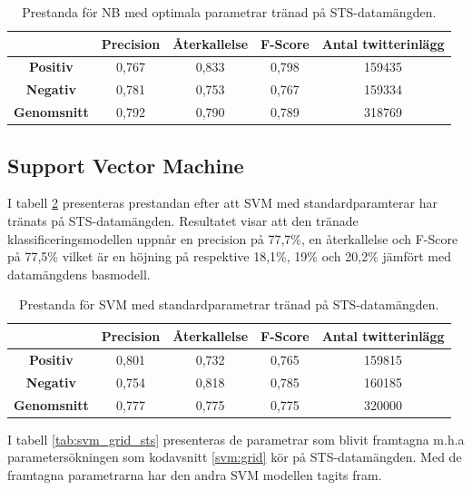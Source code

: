\documentclass{kaumasters} %
\begin{document}
\begin{table}[H]
\centering
\caption{Prestanda för NB med optimala parametrar tränad på STS-datamängden.}
\label{tab:nb_imp_sts}
    \begin{tabular}{ccccc}
    \toprule
     & \textbf{Precision} & \textbf{Återkallelse} & \textbf{F-Score} & \textbf{Antal twitterinlägg}  \\
    \midrule
    \textbf{Positiv} & 0,767 & 0,833 & 0,798 & 159435 \\
    \textbf{Negativ} & 0,781 & 0,753 & 0,767 & 159334 \\
    \midrule
    \textbf{Genomsnitt} & 0,792 & 0,790 & 0,789  & 318769 \\
    \bottomrule
\end{tabular}
\end{table}

\subsection{Support Vector Machine}
I tabell \ref{tab:svm_base_sts} presenteras prestandan efter att SVM med standardparamterar har tränats på STS-datamängden. Resultatet visar att den tränade klassificeringsmodellen uppnår en precision på 77,7\%, en återkallelse och F-Score på 77,5\% vilket är en höjning på respektive 18,1\%, 19\% och 20,2\% jämfört med datamängdens basmodell. 

\begin{table}[H]
\centering
\caption{Prestanda för SVM med standardparametrar tränad på STS-datamängden.}
\label{tab:svm_base_sts}
    \begin{tabular}{ccccc}
    \toprule
     & \textbf{Precision} & \textbf{Återkallelse} & \textbf{F-Score} & \textbf{Antal twitterinlägg}  \\
    \midrule
    \textbf{Positiv} & 0,801 & 0,732 & 0,765 & 159815 \\
    \textbf{Negativ} & 0,754 & 0,818 & 0,785 & 160185 \\
    \midrule
    \textbf{Genomsnitt} & 0,777 & 0,775 & 0,775  & 320000 \\
    \bottomrule
\end{tabular}
\end{table}

I tabell \ref{tab:svm_grid_sts} presenteras de parametrar som blivit framtagna m.h.a parametersökningen som kodavsnitt \ref{svm:grid} kör på STS-datamängden. Med de framtagna parametrarna har den andra SVM modellen tagits fram. 
\end{document}
